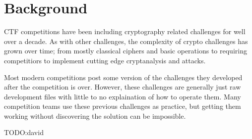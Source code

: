 \section{Background}
\label{sec:background}
CTF competitions have been including cryptography related challenges
for well over a decade. As with other challenges, the complexity of
crypto challenges has grown over time; from mostly classical ciphers
and basic operations to requiring competitiors to implement cutting
edge cryptanalysis and attacks.

Most modern competitions post some version of the challenges they
developed after the competition is over. However, these challenges are
generally just raw development files with little to no explaination of
how to operate them. Many competition teams use these previous
challenges as practice, but getting them working without discovering
the solution can be impossible.

TODO:david
